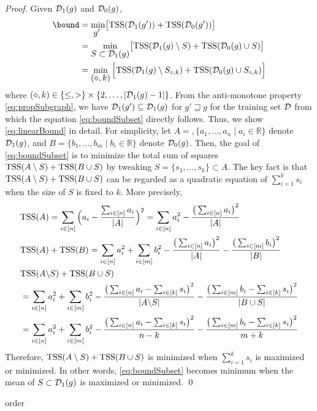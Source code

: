 \begin{proof}
  Given $\mathcal{D}_1(g)$ and $\mathcal{D}_0(g)$,
  \small
  \begin{align}
    \bound &= \mymin{g'} \bigl[ \tss(\D_1(g')) + \tss(\D_0(g'))  \bigr] \notag \\
    \label{eq:boundSubset}
    &= \mymin{S \subset \D_1(g)} \bigl[ \tss(\D_1(g) \setminus S) + \tss(\D_0(g) \cup S)  \bigr] \\
    \label{eq:linearBound}
    &= \mymin{(\diamond,k)} \Big[ \tss(\D_1(g) \setminus S_{\diamond,k}) + \tss(\D_0(g) \cup S_{\diamond,k}) \Big]
  \end{align}\normalsize
  where $ (\diamond, k) \in \{ \leq, > \} \times \{ 2, \dots, |\mathcal{D}_1(g) - 1| \} $.
  From the anti-monotone property \eqref{eq:propSubgraph}, we have
  $\mathcal{D}_1(g') \subseteq \mathcal{D}_1(g)$ for $g' \sqsupseteq g$
  for the training set $\mathcal{D}$ from which the equation \eqref{eq:boundSubset}
  directly follows. Thus, we show \eqref{eq:linearBound} in
  detail. For simplicity,
  let $A =,\{ a_1, \dots, a_n \mid a_i \in \mathbb{R} \}$ denote $\mathcal{D}_1(g)$,
  and $B = \{ b_1, \dots, b_m \mid b_i \in \mathbb{R} \}$ denote $\mathcal{D}_0(g)$.
  Then, the goal of \eqref{eq:boundSubset} is to minimize the total sum
  of squares $\mathrm{TSS}(A \setminus S) + \mathrm{TSS}(B \cup S)$ by tweaking
  $S = \{ s_1, \dots, s_k \} \subset A$.
  The key fact is that $\mathrm{TSS}(A \setminus S) + \mathrm{TSS}(B \cup S)$ can
  be regarded as a quadratic equation of $\sum_{i=1}^k s_i$ when the size
  of $S$ is fixed to $k$. More precisely,
  \begingroup
  \allowdisplaybreaks
	\begin{align*}
	  &\mathrm{TSS}(A) 
	  = \sum_{i \in[n]} \Big(a_i - \frac{\sum_{i \in[n]}a_i}{|A|}\Big)^2
	  = \sum_{i \in[n]} a_i^2 - \frac{\big(\sum_{i \in[n]} a_i\big)^2}{|A|} \\
	  &\mathrm{TSS}(A) + \mathrm{TSS}(B) 
	  = \sum_{i \in[n]} a_i^2 + \sum_{i \in[m]} b_i^2 - \frac{\big(\sum_{i \in[n]} a_i\big)^2}{|A|} - \frac{\big(\sum_{i \in[m]} b_i\big)^2}{|B|} \\
	  &\mathrm{TSS}(A \backslash S) + \mathrm{TSS}(B \cup S) \\
	  &= \sum_{i \in[n]} a_i^2 + \sum_{i \in[m]} b_i^2 - \frac{\big(\sum_{i \in[n]} a_i - \sum_{i \in[k]} s_i\big)^2}{|A \backslash S|} - \frac{\big(\sum_{i \in[m]} b_i - \sum_{i \in[k]} s_i\big)^2}{|B \cup S|} \\
	  &= \sum_{i \in[n]} a_i^2 + \sum_{i \in[m]} b_i^2 - \frac{\big(\sum_{i \in[n]} a_i - \sum_{i \in[k]} s_i\big)^2}{n - k} - \frac{\big(\sum_{i \in[m]} b_i - \sum_{i \in[k]} s_i\big)^2}{m + k} \\
	\end{align*}
      \endgroup
      Therefore, $\mathrm{TSS}(A \setminus S) + \mathrm{TSS}(B \cup S)$ is minimized
      when $\sum_{i=1}^k s_i$ is maximized or minimized. In other words,
      \eqref{eq:boundSubset} becomes minimum when the mean of $S \subset
      \mathcal{D}_1(g)$ is maximized or minimized.
	  \qed
\end{proof}

order

